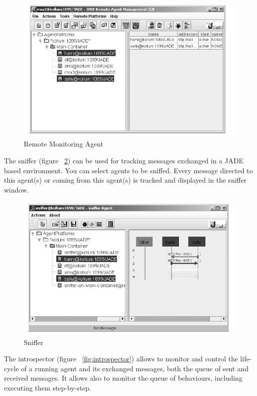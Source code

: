 \documentclass[a4paper]{article}
\begin{document}
\begin{figure}[htp]
\centering
\includegraphics[keepaspectratio,scale=0.7]{fig/rma.png}
\caption{Remote Monitoring Agent}
\label{fig:rma}
\end{figure}

The sniffer (figure ~\ref{fig:sniffer}) can be used for tracking messages exchanged in a JADE based environment.
You can select agents to be sniffed. Every message directed to this agent(s) or coming from this
agent(s) is tracked and displayed in the sniffer window.

\begin{figure}[htp]
\centering
\includegraphics[keepaspectratio,scale=0.7]{fig/sniffer.png}
\caption{Sniffer}
\label{fig:sniffer}
\end{figure}

The introspector (figure ~\ref{fig:introspector}) allows to monitor and control the life-cycle of a running agent and its exchanged messages, both the queue of sent and received messages. It allows also to monitor the queue of behaviours, including executing them step-by-step.
\end{document}
